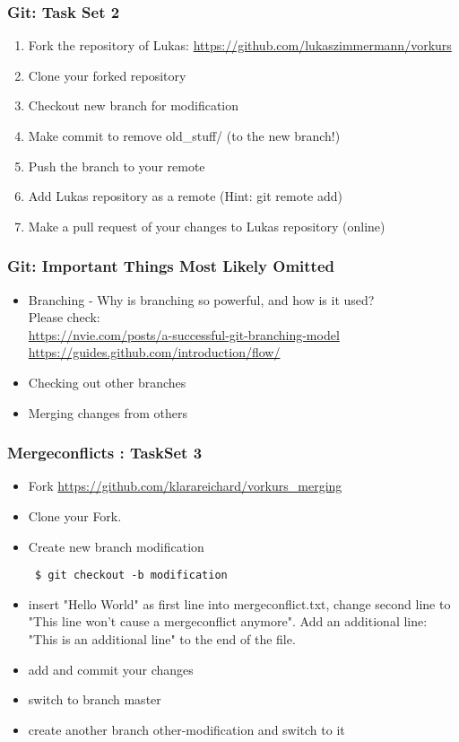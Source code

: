 \documentclass{beamer} %
\begin{document}
\begin{frame}[t, fragile]
\frametitle{Git: Task Set 2}

\begin{enumerate}
	\item Fork the repository of Lukas:   \url{https://github.com/lukaszimmermann/vorkurs}
    \item Clone your forked repository
    \item Checkout new branch for modification
    \item Make commit to remove old\_stuff/ (to the new branch!)
    \item Push the branch to your remote
    \item Add Lukas repository as a remote (Hint: git remote add)
    \item Make a pull request of your changes to Lukas repository (online)
\end{enumerate}

\end{frame}

\begin{frame}[t, fragile]
\frametitle{Git: Important Things Most Likely Omitted}

\begin{itemize}
    \item Branching - Why is branching so powerful, and how is it used? \\
    Please check: \\
    \url{https://nvie.com/posts/a-successful-git-branching-model} \\
    \url{https://guides.github.com/introduction/flow/}
    \item Checking out other branches
    \item Merging changes from others
\end{itemize}


\end{frame}

\begin{frame}[t, fragile]
\frametitle{Mergeconflicts : TaskSet 3}
\begin{itemize}
\item Fork \url{https://github.com/klarareichard/vorkurs_merging}
\item Clone your Fork.
\item Create new branch modification \begin{verbatim} 
 $ git checkout -b modification
\end{verbatim}
\item insert "Hello World" as first line into mergeconflict.txt, change second line to "This line won't cause a mergeconflict anymore". Add an additional line: "This is an additional line" to the end of the file.
\item add and commit your changes
\item switch to branch master 
\item create another branch other-modification and switch to it
\end{itemize}
\end{frame}
\end{document}
